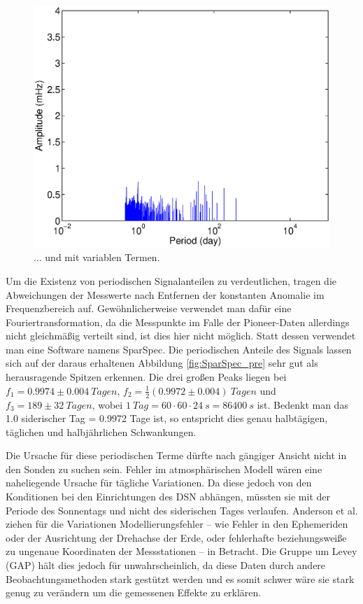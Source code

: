 \begin{figure}[htnb]
\begin{minipage}[t]{.48\linewidth}
	\includegraphics[width=\linewidth]{images/SparSpec_end}
  \caption{... und mit variablen Termen.}\label{fig:SparSpec_post}
\end{minipage}
 \end{figure}

Um die Existenz von periodischen Signalanteilen zu verdeutlichen, tragen die Abweichungen der Messwerte nach Entfernen der konstanten Anomalie im Frequenzbereich auf. Gewöhnlicherweise verwendet man dafür eine Fouriertransformation, da die Messpunkte im Falle der Pioneer-Daten allerdings nicht gleichmäßig verteilt sind, ist dies hier nicht möglich. Statt dessen verwendet man eine Software namens SparSpec.
Die periodischen Anteile des Signals lassen sich auf der daraus erhaltenen Abbildung \ref{fig:SparSpec_pre} sehr gut als herausragende Spitzen erkennen.
Die drei großen Peaks liegen bei $f_1=0.9974\pm0.004\ Tagen$, $f_2=\frac12(0.9972\pm0.004)\ Tagen$ und 
$f_3=189\pm32\ Tagen$, wobei $ 1\ Tag = 60 \cdot 60 \cdot 24 \:s = 86400\:s$ ist.
Bedenkt man das 1.0 siderischer Tag = 0.9972 Tage ist, so entspricht dies genau halbtägigen, täglichen und halbjährlichen Schwankungen.

Die Ursache für diese periodischen Terme dürfte nach gängiger Ansicht nicht in den Sonden zu suchen sein. Fehler im atmosphärischen Modell wären eine naheliegende Ursache für tägliche Variationen. Da diese jedoch von den Konditionen bei den Einrichtungen des DSN abhängen, müssten sie mit der Periode des Sonnentags und nicht des siderischen Tages verlaufen\cite{Levy2009}.
Anderson et al. ziehen für die Variationen Modellierungsfehler – wie Fehler in den Ephemeriden oder der Ausrichtung der Drehachse der Erde, oder fehlerhafte beziehungsweiße zu ungenaue Koordinaten der Messstationen – in Betracht\cite{Levy2009}\cite{Dittus2006}. %
Die Gruppe um Levey (GAP) hält dies jedoch für unwahrscheinlich, da diese Daten durch andere Beobachtungsmethoden
stark gestützt werden und es somit schwer wäre sie stark genug zu verändern um die gemessenen Effekte zu erklären. %

